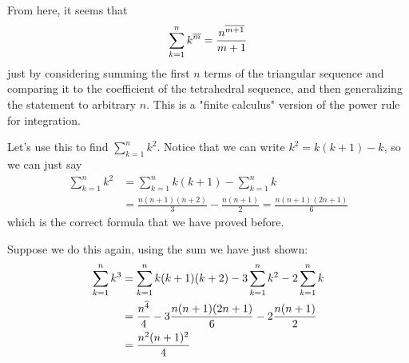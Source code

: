 \documentclass[11pt,twosided]{article}
\begin{document}
From here, it seems that
\[
	\sum_{k=1}^n {k}^{\overline{m}} = \frac{{n}^{\overline{m+1}}}{m+1}
\]
just by considering summing the first $n$ terms of the triangular sequence and comparing it to the coefficient of the tetrahedral sequence, and then generalizing the statement to arbitrary $n$. This is a "finite calculus" version of the power rule for integration. 

Let's use this to find $\sum_{k=1}^n k^2$. Notice that we can write $k^2 = k(k+1) - k$, so we can just say
\begin{align*}
\sum_{k=1}^n k^2 &= \sum_{k=1}^n k(k+1) - \sum_{k=1}^n k\\
&= \frac{n(n+1)(n+2)}{3} - \frac{n(n+1)}{2} = \frac{n(n+1)(2n+1)}{6}
\end{align*}
which is the correct formula that we have proved before. 

Suppose we do this again, using the sum we have just shown: 
\begin{align*}
\sum_{k=1}^n k^3 &= \sum_{k=1}^n k(k+1)(k+2) - 3\sum_{k=1}^n k^2 - 2 \sum_{k=1}^n k \\
&= \frac{{n}^{\overline{4}}}{4} - 3\frac{n(n+1)(2n+1)}{6} - 2\frac{n(n+1)}{2} \\
&= \frac{n^2(n+1)^2}{4}
\end{align*}
\end{document}
